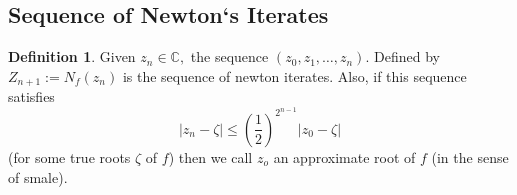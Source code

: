 \documentclass[]{article}
\theoremstyle{definition}
\newtheorem*{defn}{Definition}
\begin{document}
			\subsection{Sequence of Newton`s Iterates}
			\begin{defn}
			Given $z_n\in\mathbb{C},$ the sequence $(z_0,z_1,\ldots,z_n)$. Defined by $Z_{n+1}:= N_f(z_n)$ is the sequence of newton iterates. Also, if this sequence satisfies
			\[|z_n-\zeta | \leq (\frac{1}{2})^{2^{n-1}} |z_0-\zeta| \]
			(for some true roots $\zeta$ of $f$) then we call $z_o$ an approximate root of $f$ (in the sense of smale).
			\end{defn}
			

			

%
%
%
%
%
%
%
%
%
%
%
%
%
%
%			
\end{document}
